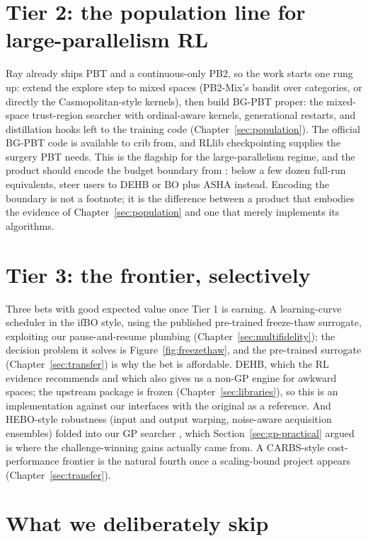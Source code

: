 \section{Tier 2: the population line for large-parallelism RL}

Ray already ships PBT and a continuous-only PB2, so the work starts one
rung up: extend the explore step to mixed spaces (PB2-Mix's bandit over
categories, or directly the Casmopolitan-style kernels), then build
BG-PBT proper: the mixed-space trust-region searcher with ordinal-aware
kernels, generational restarts, and distillation hooks left to the
training code (Chapter~\ref{sec:population}). The official BG-PBT code
is available to crib from, and RLlib checkpointing supplies the surgery
PBT needs. This is the flagship for the large-parallelism regime, and
the product should encode the budget boundary from
\citet{eimer2023hyperparameters}: below a few dozen full-run
equivalents, steer users to DEHB or BO plus ASHA instead. Encoding the
boundary is not a footnote; it is the difference between a product that
embodies the evidence of Chapter~\ref{sec:population} and one that
merely implements its algorithms.

\section{Tier 3: the frontier, selectively}

Three bets with good expected value once Tier 1 is earning. A
learning-curve scheduler in the ifBO style, using the published
pre-trained freeze-thaw surrogate, exploiting our pause-and-resume
plumbing (Chapter~\ref{sec:multifidelity}); the decision problem it
solves is Figure~\ref{fig:freezethaw}, and the pre-trained surrogate
(Chapter~\ref{sec:transfer}) is why the bet is affordable. DEHB, which
the RL evidence recommends and which also gives us a non-GP engine for
awkward spaces; the upstream package is frozen
(Chapter~\ref{sec:libraries}), so this is an implementation against our
interfaces with the original as a reference. And HEBO-style robustness
(input and output warping, noise-aware acquisition ensembles) folded
into our GP searcher \citep{cowenrivers2022hebo}, which
Section~\ref{sec:gp-practical} argued is where the challenge-winning
gains actually came from. A CARBS-style cost-performance frontier is the
natural fourth once a scaling-bound project appears
(Chapter~\ref{sec:transfer}).

\section{What we deliberately skip}

